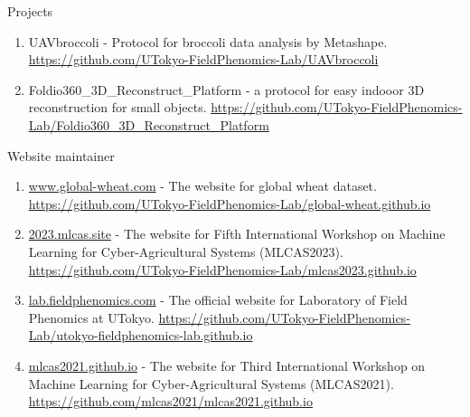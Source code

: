 \noindent
Projects

\begin{enumerate}
  \item UAVbroccoli - Protocol for broccoli data analysis by Metashape. \url{https://github.com/UTokyo-FieldPhenomics-Lab/UAVbroccoli}
  \item Foldio360\_3D\_Reconstruct\_Platform - a protocol for easy indooor 3D reconstruction for small objects. \url{https://github.com/UTokyo-FieldPhenomics-Lab/Foldio360_3D_Reconstruct_Platform}
\end{enumerate}

\noindent
Website maintainer

\begin{enumerate}
  \item \url{www.global-wheat.com} - The website for global wheat dataset. \url{https://github.com/UTokyo-FieldPhenomics-Lab/global-wheat.github.io}
  \item \url{2023.mlcas.site} - The website for Fifth International Workshop on Machine Learning for Cyber-Agricultural Systems (MLCAS2023). \url{https://github.com/UTokyo-FieldPhenomics-Lab/mlcas2023.github.io}
  \item \url{lab.fieldphenomics.com} - The official website for Laboratory of Field Phenomics at UTokyo. \url{https://github.com/UTokyo-FieldPhenomics-Lab/utokyo-fieldphenomics-lab.github.io}
  \item \url{mlcas2021.github.io} - The website for Third International Workshop on Machine Learning for Cyber-Agricultural Systems (MLCAS2021). \url{https://github.com/mlcas2021/mlcas2021.github.io}
\end{enumerate}
